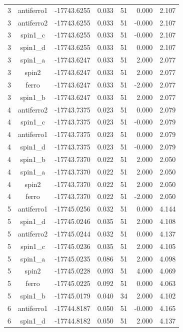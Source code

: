 \begin{longtable}{@{}ccrrrrr@{}}
\rowcolor{gray!20} 3 & antiferro1 & -17743.6255 & 0.033 & 51 & 0.000 & 2.107 \\
3 & antiferro2 & -17743.6255 & 0.033 & 51 & -0.000 & 2.107 \\
3 & spin1\_c & -17743.6255 & 0.033 & 51 & -0.000 & 2.107 \\
3 & spin1\_d & -17743.6255 & 0.033 & 51 & 0.000 & 2.107 \\
3 & spin1\_a & -17743.6247 & 0.033 & 51 & 2.000 & 2.077 \\
3 & spin2 & -17743.6247 & 0.033 & 51 & 2.000 & 2.077 \\
3 & ferro & -17743.6247 & 0.033 & 51 & -2.000 & 2.077 \\
3 & spin1\_b & -17743.6247 & 0.033 & 51 & 2.000 & 2.077 \\
\rowcolor{gray!20} 4 & antiferro2 & -17743.7375 & 0.023 & 51 & 0.000 & 2.079 \\
4 & spin1\_c & -17743.7375 & 0.023 & 51 & -0.000 & 2.079 \\
4 & antiferro1 & -17743.7375 & 0.023 & 51 & 0.000 & 2.079 \\
4 & spin1\_d & -17743.7375 & 0.023 & 51 & -0.000 & 2.079 \\
4 & spin1\_b & -17743.7370 & 0.022 & 51 & 2.000 & 2.050 \\
4 & spin1\_a & -17743.7370 & 0.022 & 51 & 2.000 & 2.050 \\
4 & spin2 & -17743.7370 & 0.022 & 51 & 2.000 & 2.050 \\
4 & ferro & -17743.7370 & 0.022 & 51 & -2.000 & 2.050 \\
\rowcolor{gray!20} 5 & antiferro1 & -17745.0256 & 0.032 & 51 & 0.000 & 4.144 \\
5 & spin1\_d & -17745.0246 & 0.035 & 51 & 2.000 & 4.108 \\
5 & antiferro2 & -17745.0244 & 0.032 & 51 & 0.000 & 4.137 \\
5 & spin1\_c & -17745.0236 & 0.035 & 51 & 2.000 & 4.105 \\
5 & spin1\_a & -17745.0235 & 0.086 & 51 & 2.000 & 4.098 \\
5 & spin2 & -17745.0228 & 0.093 & 51 & 4.000 & 4.069 \\
5 & ferro & -17745.0225 & 0.092 & 51 & 0.000 & 4.063 \\
5 & spin1\_b & -17745.0179 & 0.040 & 34 & 2.000 & 4.102 \\
\rowcolor{gray!20} 6 & antiferro1 & -17744.8187 & 0.050 & 51 & -0.000 & 4.165 \\
6 & spin1\_d & -17744.8182 & 0.050 & 51 & 2.000 & 4.137 \\

\end{longtable}
